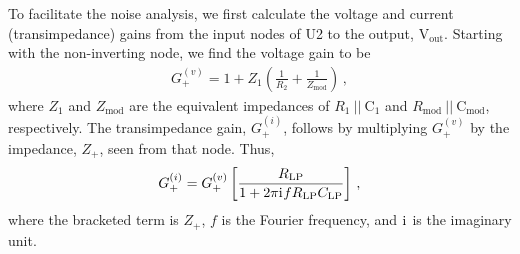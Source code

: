 \documentclass[aip,rsi,reprint]{revtex4-1} %
\newcommand{\iu}{\mathrm{i}\mkern1mu}
\begin{document}
To facilitate the noise analysis, we first calculate the voltage and current (transimpedance) gains from the input nodes of U2 to the output, $\text{V}_\text{out}$.
Starting with the non-inverting node, we find the voltage gain to be
\begin{align}
G_{+}^{(v)} = 1 + Z_1\left(\frac{1}{R_2} + \frac{1}{Z_\text{mod}}\right)\,,
\end{align}
where $Z_1$ and $Z_\text{mod}$ are the equivalent impedances of $R_1~||~\text{C}_1$ and $R_\text{mod}~||~\text{C}_\text{mod}$, respectively.
The transimpedance gain, $G^{(i)}_{+}$, follows by multiplying $G_+^{(v)}$ by the impedance, $Z_+$, seen from that node. %
Thus,
\begin{align}
G_{+}^{(i)} = G_{+}^{(v)}\left[\frac{R_\text{LP}}{1+2\pi \iu f R_\text{LP} C_\text{LP}}\right]\,,
\end{align}
where the bracketed term is $Z_+$, $f$ is the Fourier frequency, and $\iu$ is the imaginary unit.
 
\end{document}
